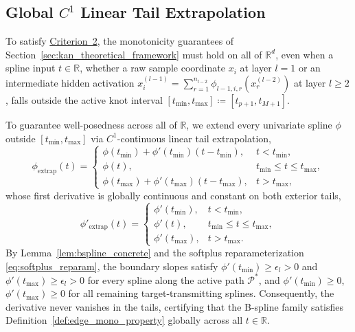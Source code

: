 \documentclass[11pt,a4paper]{article}
\theoremstyle{plain}
\theoremstyle{definition}
\theoremstyle{remark}
\begin{document}
\subsection{Global \texorpdfstring{$C^1$}{C1} Linear Tail Extrapolation}
\label{subsec:linear_extrapolation}

To satisfy \hyperref[crit:global_domain]{Criterion~2}, the monotonicity guarantees of Section~\ref{sec:kan_theoretical_framework} must hold on all of $\mathbb{R}^d$, even when a spline input $t \in \mathbb{R}$, whether a raw sample coordinate $x_i$ at layer $l=1$ or an intermediate hidden activation $x^{(l-1)}_i = \sum_{r=1}^{n_{l-2}} \phi_{l-1, i, r}(x^{(l-2)}_r)$ at layer $l \ge 2$, falls outside the active knot interval $[t_{\min}, t_{\max}] \coloneqq [t_{p+1}, t_{M+1}]$.

To guarantee well-posedness across all of $\mathbb{R}$, we extend every univariate spline $\phi$ outside $[t_{\min}, t_{\max}]$ via $C^1$-continuous linear tail extrapolation,
\begin{equation}
    \phi_{\text{extrap}}(t) = \begin{cases}
        \phi(t_{\min}) + \phi'(t_{\min})(t - t_{\min}), & t < t_{\min}, \\
        \phi(t), & t_{\min} \le t \le t_{\max}, \\
        \phi(t_{\max}) + \phi'(t_{\max})(t - t_{\max}), & t > t_{\max},
    \end{cases}
    \label{eq:linear_extrap}
\end{equation}
whose first derivative is globally continuous and constant on both exterior tails,
\begin{equation}
    \phi'_{\text{extrap}}(t) = \begin{cases}
        \phi'(t_{\min}), & t < t_{\min}, \\
        \phi'(t), & t_{\min} \le t \le t_{\max}, \\
        \phi'(t_{\max}), & t > t_{\max}.
    \end{cases}
    \label{eq:linear_extrap_deriv}
\end{equation}
By Lemma~\ref{lem:bspline_concrete} and the softplus reparameterization \eqref{eq:softplus_reparam}, the boundary slopes satisfy $\phi'(t_{\min}) \ge \epsilon_l > 0$ and $\phi'(t_{\max}) \ge \epsilon_l > 0$ for every spline along the active path $\mathcal{P}^*$, and $\phi'(t_{\min}) \ge 0$, $\phi'(t_{\max}) \ge 0$ for all remaining target-transmitting splines. Consequently, the derivative never vanishes in the tails, certifying that the B-spline family satisfies Definition~\ref{def:edge_mono_property} globally across all $t \in \mathbb{R}$.
\end{document}
